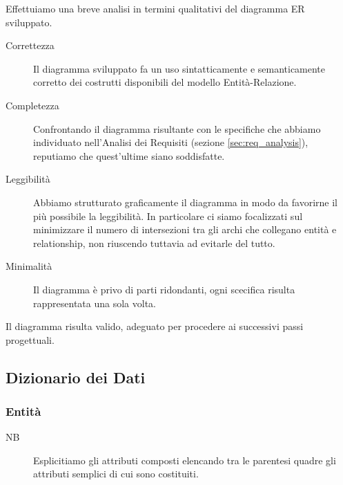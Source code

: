 		Effettuiamo una breve analisi in termini qualitativi del diagramma ER sviluppato.
		
		\begin{description}
			\item[Correttezza] Il diagramma sviluppato fa un uso sintatticamente e semanticamente corretto dei costrutti disponibili del modello Entità-Relazione.
			\item[Completezza] Confrontando il diagramma risultante con le specifiche che abbiamo individuato nell'Analisi dei Requisiti (sezione \ref{sec:req_analysis}), reputiamo che quest'ultime siano soddisfatte.
			\item[Leggibilità] Abbiamo strutturato graficamente il diagramma in modo da favorirne il più possibile la leggibilità. In particolare ci siamo focalizzati sul minimizzare il numero di intersezioni tra gli archi che collegano entità e relationship, non riuscendo tuttavia ad evitarle del tutto.
			\item[Minimalità] Il diagramma è privo di parti ridondanti, ogni scecifica risulta rappresentata una sola volta.
		\end{description}
		
		Il diagramma risulta valido, adeguato per procedere ai successivi passi progettuali.
	
	\subsection{Dizionario dei Dati}
	\label{sec:data_dict}
		
		\subsubsection{Entità}
		\label{sec:entities}
			
			\begin{description}
				\item[NB] Esplicitiamo gli attributi composti elencando tra le parentesi quadre gli attributi semplici di cui sono costituiti.
			\end{description}
	
